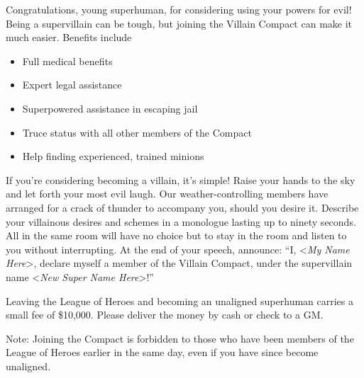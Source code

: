 \documentclass[white]{guildcamp1}
\begin{document}
\name{\wVillainRecruitment{}}

Congratulations, young superhuman, for considering using your powers for evil!  Being a supervillain can be tough, but joining the Villain Compact can make it much easier.  Benefits include

\begin{itemize}
\item Full medical benefits
\item Expert legal assistance
\item Superpowered assistance in escaping jail
\item Truce status with all other members of the Compact
\item Help finding experienced, trained minions
\end{itemize}

If you're considering becoming a villain, it's simple!  Raise your hands to the sky and let forth your most evil laugh.  Our weather-controlling members have arranged for a crack of thunder to accompany you, should you desire it.  Describe your villainous desires and schemes in a monologue lasting up to ninety seconds.  All in the same room will have no choice but to stay in the room and listen to you without interrupting.  At the end of your speech, announce: ``I, <\textit{My Name Here}>, declare myself a member of the Villain Compact, under the supervillain name <\textit{New Super Name Here}>!''

Leaving the League of Heroes and becoming an unaligned superhuman carries a small fee of \$10,000.  Please deliver the money by cash or check to a GM.

Note: Joining the Compact is forbidden to those who have been members of the League of Heroes earlier in the same day, even if you have since become unaligned.
\end{document}
